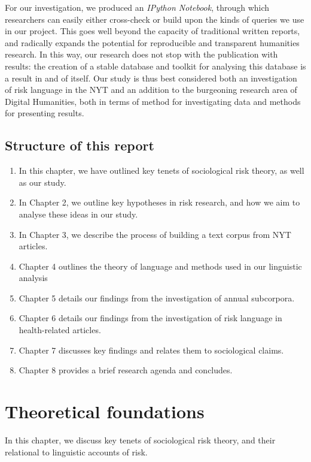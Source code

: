 For our investigation, we produced an \emph{IPython Notebook}, through which researchers can easily either cross-check or build upon the kinds of queries we use in our project. This goes well beyond the capacity of traditional written reports, and radically expands the potential for reproducible and transparent humanities research. In this way, our research does not stop with the publication with results: the creation of a stable database and toolkit for analysing this database is a result in and of itself. Our study is thus best considered both an investigation of risk language in the NYT and an addition to the burgeoning research area of Digital Humanities, both in terms of method for investigating data and methods for presenting results.

\section{Structure of this report}

\begin{enumerate}
\item In this chapter, we have outlined key tenets of sociological risk theory, as well as our study.
\item In Chapter 2, we outline key hypotheses in risk research, and how we aim to analyse these ideas in our study.
\item In Chapter 3, we describe the process of building a text corpus from NYT articles.
\item Chapter 4 outlines the theory of language and methods used in our linguistic analysis
\item Chapter 5 details our findings from the investigation of annual subcorpora.
\item Chapter 6 details our findings from the investigation of risk language in health-related articles.
\item Chapter 7 discusses key findings and relates them to sociological claims.
\item Chapter 8 provides a brief research agenda and concludes.
\end{enumerate}

\chapter{Theoretical foundations}

In this chapter, we discuss key tenets of sociological risk theory, and their relational to linguistic accounts of risk.

